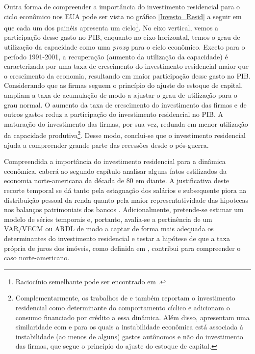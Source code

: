 Outra forma de compreender a importância do investimento residencial para o ciclo econômico nos EUA pode ser vista no gráfico \ref{Investo_Resid} a seguir em que cada um dos painéis apresenta um ciclo\footnote{Raciocínio semelhante pode ser encontrado em \textcite{fiebiger_semi-autonomous_2018}.}. No eixo vertical, vemos a participação desse gasto no PIB, enquanto no eixo horizontal, temos o grau de utilização da capacidade como uma \textit{proxy} para o ciclo econômico. Exceto para o período 1991-2001, a recuperação (aumento da utilização da capacidade) é caracterizada por uma taxa de crescimento do investimento residencial maior que o crescimento da economia, resultando em maior participação desse gasto no PIB. Considerando que as firmas seguem o princípio do ajuste do estoque de capital, ampliam a taxa de acumulação de modo a ajustar o grau de utilização para o grau normal. O aumento da taxa de crescimento do investimento das firmas e de outros gastos reduz a participação do investimento residencial no PIB. A maturação do investimento das firmas, por sua vez, redunda em menor utilização da capacidade produtiva\footnote{Complementarmente, os trabalhos de \textcite{fiebiger_semi-autonomous_2018} e \textcite{fiebiger_trend_2017} também reportam o investimento residencial como determinante do comportamento cíclico e adicionam o consumo financiado por crédito a essa dinâmica. Além disso, apresentam uma similaridade com \textcite{dejuan_hidden_2017} e \textcite{teixeira_crescimento_2015} para os quais a instabilidade econômica está associada à instabilidade (ao menos de alguns) gastos autônomos e não do investimento das firmas, que segue o princípio do ajuste do estoque de capital.}. Desse modo, conclui-se que o investimento residencial ajuda a compreender grande parte das recessões desde o pós-guerra.

Compreendida a importância do investimento residencial para a dinâmica econômica, caberá ao segundo capítulo analisar alguns fatos estilizados da economia norte-americana da década de 80 em diante. A justificativa deste recorte temporal se dá tanto pela estagnação dos salários e subsequente piora na distribuição pessoal da renda \cites{barba_rising_2009}{teixeira_uma_2011} quanto pela maior representatividade das hipotecas nos balanços patrimoniais dos bancos \cite{jorda_great_2014}. Adicionalmente, pretende-se estimar um modelo de séries temporais e, portanto, avalia-se a pertinência de um VAR/VECM ou ARDL de modo a captar de forma mais adequada os determinantes do investimento residencial e testar a hipótese de que  a taxa própria de juros dos imóveis, como definida em \textcite{teixeira_crescimento_2015}, contribui para compreender o caso norte-americano.


